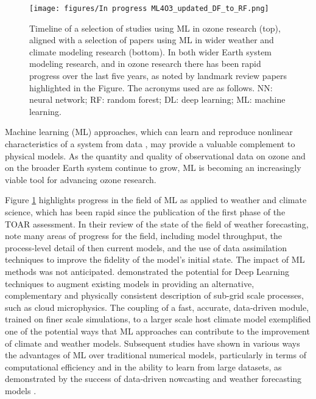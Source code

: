 \documentclass[gmd, manuscript]{copernicus}
\begin{document}
\begin{figure}
    \centering
    \texttt{[image: figures/In progress ML4O3\_updated\_DF\_to\_RF.png]} 
    \caption{Timeline of a selection of studies using ML in ozone research (top), aligned with a selection of papers using ML in wider weather and climate modeling research (bottom). In both wider Earth system modeling research, and in ozone research there has been rapid progress over the last five years, as noted by landmark review papers highlighted in the Figure. The acronyms used are as follows. NN: neural network; RF: random forest; DL: deep learning; ML: machine learning.}
    \label{fig:timeline}
\end{figure}

Machine learning (ML) approaches, which can learn and reproduce nonlinear characteristics of a system from data \citep{hornik_multilayer_1989}, may provide a valuable complement to physical models. As the quantity and quality of observational data on ozone \citep{Schultz2017} and on the broader Earth system \citep{doi:10.1080/17538947.2016.1250829,reichstein_deep_2019} continue to grow, ML is becoming an increasingly viable tool for advancing ozone research. 

Figure \ref{fig:timeline} highlights progress in the field of ML as applied to weather and climate science, which has been rapid since the publication of the first phase of the TOAR assessment.  In their review of the state of the field of weather forecasting, \citet{bauer_quiet_2015} note many areas of progress for the field, including model throughput, the process-level detail of then current models, and the use of data assimilation techniques to improve the fidelity of the model's initial state. The impact of ML methods was not anticipated.  
\citet{rasp_deep_2018} demonstrated the potential for Deep Learning techniques to augment existing models in providing an alternative, complementary and physically consistent description of sub-grid scale processes, such as cloud microphysics.  The coupling of a fast, accurate, data-driven module, trained on finer scale simulations, to a larger scale host climate model exemplified one of the potential ways that ML approaches can contribute to the improvement of climate and weather models.  
Subsequent studies have shown in various ways the advantages of ML over traditional numerical models, particularly in terms of computational efficiency and in the ability to learn from large datasets, as demonstrated by the success of data-driven nowcasting and weather forecasting models \citep{bi_accurate_2023, lam_learning_2023, price_gencast_2024}.  
\end{document}
